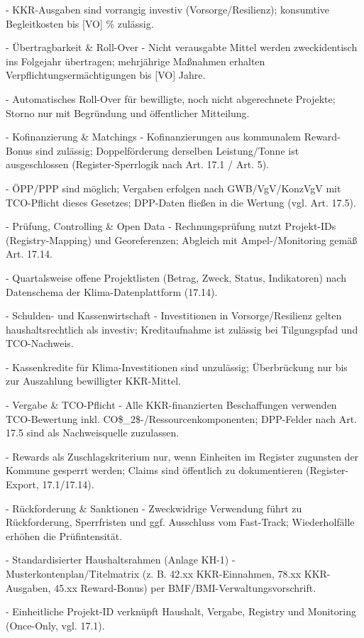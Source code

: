 \documentclass[12pt,a4paper]{scrartcl}
\begin{document}
- KKR-Ausgaben sind vorrangig investiv (Vorsorge/Resilienz); konsumtive Begleitkosten bis [VO] \% zulässig.

- Übertragbarkeit \& Roll-Over
- Nicht verausgabte Mittel werden zweckidentisch ins Folgejahr übertragen; mehrjährige Maßnahmen erhalten Verpflichtungsermächtigungen bis [VO] Jahre.

- Automatisches Roll-Over für bewilligte, noch nicht abgerechnete Projekte; Storno nur mit Begründung und öffentlicher Mitteilung.

- Kofinanzierung \& Matchings
- Kofinanzierungen aus kommunalem Reward-Bonus sind zulässig; Doppelförderung derselben Leistung/Tonne ist ausgeschlossen (Register-Sperrlogik nach Art. 17.1 / Art. 5).

- ÖPP/PPP sind möglich; Vergaben erfolgen nach GWB/VgV/KonzVgV mit TCO-Pflicht dieses Gesetzes; DPP-Daten fließen in die Wertung (vgl. Art. 17.5).

- Prüfung, Controlling \& Open Data
- Rechnungsprüfung nutzt Projekt-IDs (Registry-Mapping) und Georeferenzen; Abgleich mit Ampel-/Monitoring gemäß Art. 17.14.

- Quartalsweise offene Projektlisten (Betrag, Zweck, Status, Indikatoren) nach Datenschema der Klima-Datenplattform (17.14).

- Schulden- und Kassenwirtschaft
- Investitionen in Vorsorge/Resilienz gelten haushaltsrechtlich als investiv; Kreditaufnahme ist zulässig bei Tilgungspfad und TCO-Nachweis.

- Kassenkredite für Klima-Investitionen sind unzulässig; Überbrückung nur bis zur Auszahlung bewilligter KKR-Mittel.

- Vergabe \& TCO-Pflicht
- Alle KKR-finanzierten Beschaffungen verwenden TCO-Bewertung inkl. CO\$\_2\$-/Ressourcenkomponenten; DPP-Felder nach Art. 17.5 sind als Nachweisquelle zuzulassen.

- Rewards als Zuschlagskriterium nur, wenn Einheiten im Register zugunsten der Kommune gesperrt werden; Claims sind öffentlich zu dokumentieren (Register-Export, 17.1/17.14).

- Rückforderung \& Sanktionen
- Zweckwidrige Verwendung führt zu Rückforderung, Sperrfristen und ggf. Ausschluss vom Fast-Track; Wiederholfälle erhöhen die Prüfintensität.

- Standardisierter Haushaltsrahmen (Anlage KH-1)
- Musterkontenplan/Titelmatrix (z. B. 42.xx KKR-Einnahmen, 78.xx KKR-Ausgaben, 45.xx Reward-Bonus) per BMF/BMI-Verwaltungsvorschrift.

- Einheitliche Projekt-ID verknüpft Haushalt, Vergabe, Registry und Monitoring (Once-Only, vgl. 17.1).
\end{document}
